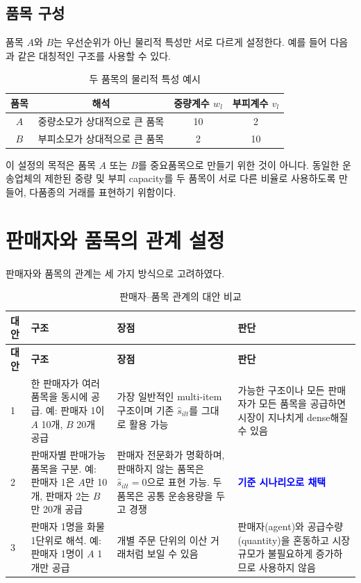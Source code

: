 \documentclass[11pt,a4paper]{article}
\begin{document}
\subsection{품목 구성}

품목 $A$와 $B$는 우선순위가 아닌 물리적 특성만 서로 다르게 설정한다.
예를 들어 다음과 같은 대칭적인 구조를 사용할 수 있다.

\begin{table}[h!]
\centering
\caption{두 품목의 물리적 특성 예시}
\begin{tabular}{cccc}
\toprule
\textbf{품목} & \textbf{해석} & \textbf{중량계수 $w_l$} & \textbf{부피계수 $v_l$} \\
\midrule
$A$ & 중량소모가 상대적으로 큰 품목 & 10 & 2 \\
$B$ & 부피소모가 상대적으로 큰 품목 & 2 & 10 \\
\bottomrule
\end{tabular}
\end{table}

이 설정의 목적은 품목 $A$ 또는 $B$를 중요품목으로 만들기 위한 것이 아니다.
동일한 운송업체의 제한된 중량 및 부피 capacity를 두 품목이 서로 다른 비율로 사용하도록 만들어, 다품종의 거래를 표현하기 위함이다.

\section{판매자와 품목의 관계 설정}

판매자와 품목의 관계는 세 가지 방식으로 고려하였다.

\begin{longtable}{p{}p{}p{}p{}}
\caption{판매자--품목 관계의 대안 비교} \\
\toprule
\textbf{대안} & \textbf{구조} & \textbf{장점} & \textbf{판단} \\
\midrule
\endfirsthead
\toprule
\textbf{대안} & \textbf{구조} & \textbf{장점} & \textbf{판단} \\
\midrule
\endhead

1 &
한 판매자가 여러 품목을 동시에 공급.
예: 판매자 1이 $A$ 10개, $B$ 20개 공급 &
가장 일반적인 multi-item 구조이며 기존 $\hat s_{ilt}$를 그대로 활용 가능 &
가능한 구조이나 모든 판매자가 모든 품목을 공급하면 시장이 지나치게 dense해질 수 있음 \\

2 &
판매자별 판매가능 품목을 구분.
예: 판매자 1은 $A$만 10개, 판매자 2는 $B$만 20개 공급 &
판매자 전문화가 명확하며, 판매하지 않는 품목은 $\hat s_{ilt}=0$으로 표현 가능.
두 품목은 공통 운송용량을 두고 경쟁 &
\textcolor{blue}{\textbf{기준 시나리오로 채택}} \\

3 &
판매자 1명을 화물 1단위로 해석.
예: 판매자 1명이 $A$ 1개만 공급 &
개별 주문 단위의 이산 거래처럼 보일 수 있음 &
판매자(agent)와 공급수량(quantity)을 혼동하고 시장규모가 불필요하게 증가하므로 사용하지 않음 \\

\bottomrule
\end{longtable}
\end{document}
